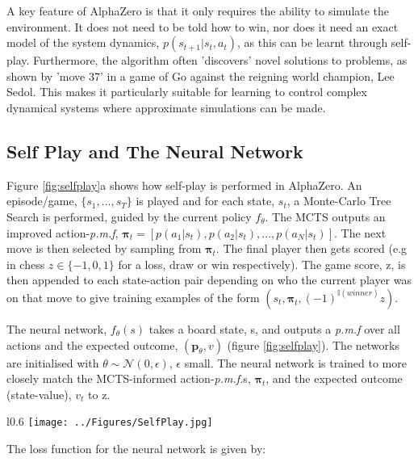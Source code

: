 \documentclass[main.tex]{subfiles}
\begin{document}
A key feature of AlphaZero is that it only requires the ability to simulate the environment. It does not need to be told how to win, nor does it need an exact model of the system dynamics, $p(s_{t+1} |s_t, a_t)$, as this can be learnt through self-play. Furthermore, the algorithm often 'discovers' novel solutions to problems, as shown by 'move 37' in a game of Go against the reigning world champion, Lee Sedol. This makes it particularly suitable for learning to control complex dynamical systems where approximate simulations can be made.

\subsection{Self Play and The Neural Network}

Figure \ref{fig:selfplay}a
shows how self-play is performed in AlphaZero. An episode/game, $\{s_1, ..., s_T\}$ is played and for each state, $s_t$, a Monte-Carlo Tree Search is performed, guided by the current policy $f_\theta$. The MCTS outputs an improved action-\textit{p.m.f}, $\boldsymbol{\pi}_t = [p(a_1|s_t), p(a_2|s_t), ..., p(a_N|s_t)]$. The next move is then selected by sampling from $\boldsymbol{\pi}_t$. The final player then gets scored (e.g in chess $z \in \{-1, 0, 1\} $ for a loss, draw or win respectively). The game score, z, is then appended to each state-action pair depending on who the current player was on that move to give training examples of the form $(s_t, \boldsymbol{\pi}_t, (-1)^{\mathbb{I}(winner)}z)$. 

The neural network, $f_\theta(s)$ takes a board state, s, and outputs a \textit{p.m.f} over all actions and the expected outcome, $(\boldsymbol{p}_\theta, v)$ (figure \ref{fig:selfplay}). The networks are initialised with $\theta \sim \mathcal{N}(0, \epsilon)$, $\epsilon$ small. The neural network is trained to more closely match the MCTS-informed action-\textit{p.m.f.}s, $\boldsymbol{\pi}_t$, and the expected outcome (state-value), $v_t$ to z.

\begin{wrapfigure}{l}{0.6\textwidth}
   \centering
   \texttt{[image: ../Figures/SelfPlay.jpg]}
   \caption{A schematic showing how self-play and policy training are performed. Taken from \cite{AlphaGoZero}.}
   \label{fig:selfplay}
   \vspace{0.5cm}
\end{wrapfigure}

The loss function for the neural network is given by:
\end{document}
